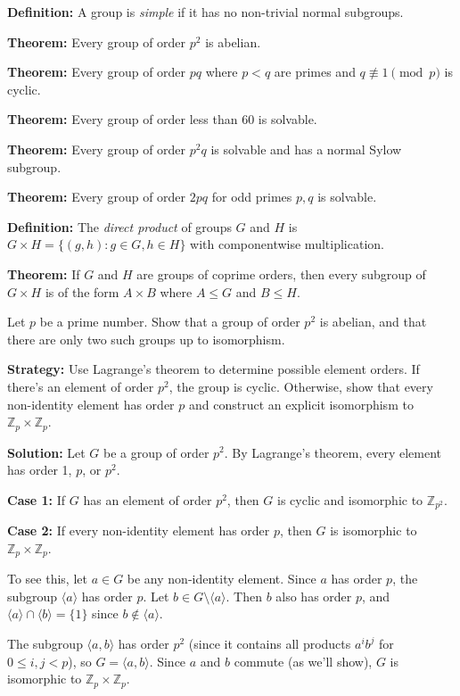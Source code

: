 \textbf{Definition:} A group is \textit{simple} if it has no non-trivial normal subgroups.

\textbf{Theorem:} Every group of order $p^2$ is abelian.

\textbf{Theorem:} Every group of order $pq$ where $p < q$ are primes and $q \not\equiv 1 \pmod{p}$ is cyclic.

\textbf{Theorem:} Every group of order less than 60 is solvable.

\textbf{Theorem:} Every group of order $p^2q$ is solvable and has a normal Sylow subgroup.

\textbf{Theorem:} Every group of order $2pq$ for odd primes $p, q$ is solvable.

\textbf{Definition:} The \textit{direct product} of groups $G$ and $H$ is $G \times H = \{(g,h) : g \in G, h \in H\}$ with componentwise multiplication.

\textbf{Theorem:} If $G$ and $H$ are groups of coprime orders, then every subgroup of $G \times H$ is of the form $A \times B$ where $A \leq G$ and $B \leq H$.

\begin{problembox}
Let $p$ be a prime number. Show that a group of order $p^2$ is abelian, and that there are only two such groups up to isomorphism.
\end{problembox}

\noindent\textbf{Strategy:} Use Lagrange's theorem to determine possible element orders. If there's an element of order $p^2$, the group is cyclic. Otherwise, show that every non-identity element has order $p$ and construct an explicit isomorphism to $\mathbb{Z}_p \times \mathbb{Z}_p$.

\noindent\textbf{Solution:} Let $G$ be a group of order $p^2$. By Lagrange's theorem, every element has order 1, $p$, or $p^2$.

\textbf{Case 1:} If $G$ has an element of order $p^2$, then $G$ is cyclic and isomorphic to $\mathbb{Z}_{p^2}$.

\textbf{Case 2:} If every non-identity element has order $p$, then $G$ is isomorphic to $\mathbb{Z}_p \times \mathbb{Z}_p$.

To see this, let $a \in G$ be any non-identity element. Since $a$ has order $p$, the subgroup $\langle a \rangle$ has order $p$. Let $b \in G \setminus \langle a \rangle$. Then $b$ also has order $p$, and $\langle a \rangle \cap \langle b \rangle = \{1\}$ since $b \notin \langle a \rangle$.

The subgroup $\langle a, b \rangle$ has order $p^2$ (since it contains all products $a^ib^j$ for $0 \leq i, j < p$), so $G = \langle a, b \rangle$. Since $a$ and $b$ commute (as we'll show), $G$ is isomorphic to $\mathbb{Z}_p \times \mathbb{Z}_p$.

